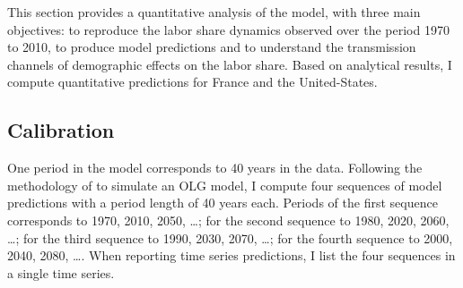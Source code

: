 \documentclass[
]{article}
\begin{document}
This section provides a quantitative analysis of the model, with three main objectives: to reproduce the labor share dynamics observed over the period 1970 to 2010, to produce model predictions and to understand the transmission channels of demographic effects on the labor share. Based on analytical results, I compute quantitative predictions for France and the United-States.

\hypertarget{calibration}{%
\subsection{Calibration}\label{calibration}}

One period in the model corresponds to 40 years in the data. Following the methodology of \citet{Gonzalez-Eiras2012} to simulate an OLG model, I compute four sequences of model predictions with a period length of 40 years each. Periods of the first sequence corresponds to 1970, 2010, 2050, \ldots; for the second sequence to 1980, 2020, 2060, \ldots; for the third sequence to 1990, 2030, 2070, \ldots; for the fourth sequence to 2000, 2040, 2080, \ldots. When reporting time series predictions, I list the four sequences in a single time series.
\end{document}
